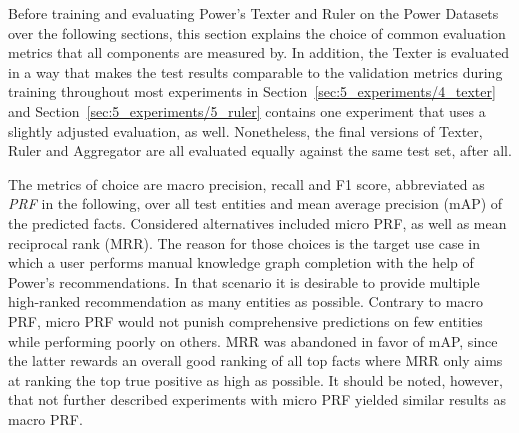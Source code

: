 
Before training and evaluating Power's Texter and Ruler on the Power Datasets over the following sections, this section explains the choice of common evaluation metrics that all components are measured by. In addition, the Texter is evaluated in a way that makes the test results comparable to the validation metrics during training throughout most experiments in Section~\ref{sec:5_experiments/4_texter} and Section~\ref{sec:5_experiments/5_ruler} contains one experiment that uses a slightly adjusted evaluation, as well. Nonetheless, the final versions of Texter, Ruler and Aggregator are all evaluated equally against the same test set, after all.

The metrics of choice are macro precision, recall and F1 score, abbreviated as \emph{PRF} in the following, over all test entities and mean average precision (mAP) of the predicted facts. Considered alternatives included micro PRF, as well as mean reciprocal rank (MRR). The reason for those choices is the target use case in which a user performs manual knowledge graph completion with the help of Power's recommendations. In that scenario it is desirable to provide multiple high-ranked recommendation as many entities as possible. Contrary to macro PRF, micro PRF would not punish comprehensive predictions on few entities while performing poorly on others. MRR was abandoned in favor of mAP, since the latter rewards an overall good ranking of all top facts where MRR only aims at ranking the top true positive as high as possible. It should be noted, however, that not further described experiments with micro PRF yielded similar results as macro PRF.
